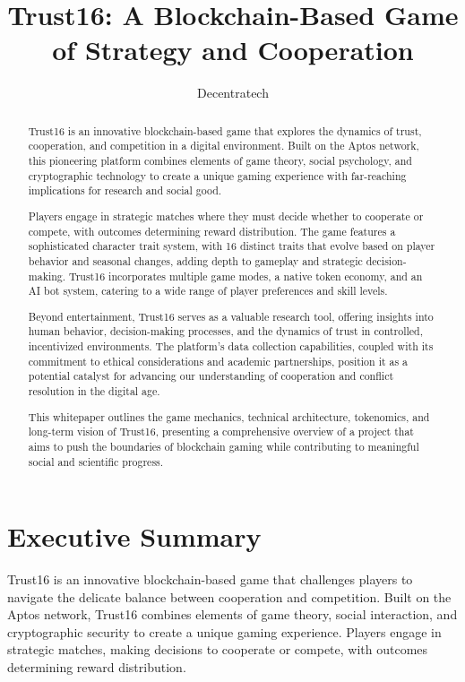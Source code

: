 \documentclass[]{article}
\begin{document}
\title{Trust16: A Blockchain-Based Game of Strategy and
Cooperation}
\author{Decentratech}
\maketitle

\begin{abstract}
Trust16 is an innovative blockchain-based game that explores the dynamics of trust, cooperation, and competition in a digital environment. Built on the Aptos network, this pioneering platform combines elements of game theory, social psychology, and cryptographic technology to create a unique gaming experience with far-reaching implications for research and social good.

Players engage in strategic matches where they must decide whether to cooperate or compete, with outcomes determining reward distribution. The game features a sophisticated character trait system, with 16 distinct traits that evolve based on player behavior and seasonal changes, adding depth to gameplay and strategic decision-making. Trust16 incorporates multiple game modes, a native token economy, and an AI bot system, catering to a wide range of player preferences and skill levels.

Beyond entertainment, Trust16 serves as a valuable research tool, offering insights into human behavior, decision-making processes, and the dynamics of trust in controlled, incentivized environments. The platform's data collection capabilities, coupled with its commitment to ethical considerations and academic partnerships, position it as a potential catalyst for advancing our understanding of cooperation and conflict resolution in the digital age.

This whitepaper outlines the game mechanics, technical architecture, tokenomics, and long-term vision of Trust16, presenting a comprehensive overview of a project that aims to push the boundaries of blockchain gaming while contributing to meaningful social and scientific progress.
\end{abstract}

\tableofcontents

\section{Executive Summary}

Trust16 is an innovative blockchain-based game that challenges players to navigate the delicate balance between cooperation and competition. Built on the Aptos network, Trust16 combines elements of game theory, social interaction, and cryptographic security to create a unique gaming experience. Players engage in strategic matches, making decisions to cooperate or compete, with outcomes determining reward distribution. 
\end{document}
